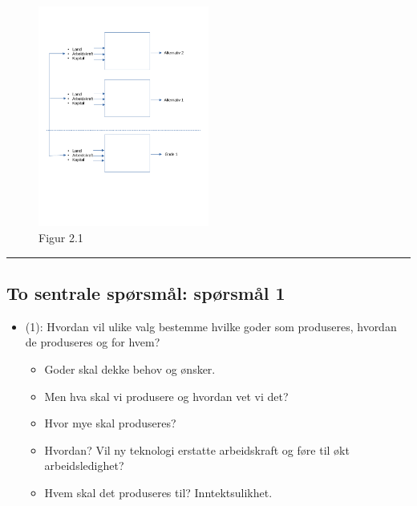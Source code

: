 \documentclass[
  letterpaper,
  DIV=11,
  numbers=noendperiod]{scrartcl}
\providecommand{\tightlist}{%
  \setlength{\itemsep}{0pt}\setlength{\parskip}{0pt}}\usepackage{longtable,booktabs,array}
\begin{document}
\begin{figure}[H]

{\centering \includegraphics[width=0.5\textwidth,height=\textheight]{allenotater_files/mediabag/drawio/alternativ.pdf}

}

\caption{Figur 2.1}

\end{figure}%

\begin{center}\rule{0.5\linewidth}{0.5pt}\end{center}

\subsection{To sentrale spørsmål: spørsmål
1}\label{to-sentrale-spuxf8rsmuxe5l-spuxf8rsmuxe5l-1}

\begin{itemize}
\tightlist
\item
  (1): Hvordan vil ulike valg bestemme hvilke goder som produseres,
  hvordan de produseres og for hvem?

  \begin{itemize}
  \tightlist
  \item
    Goder skal dekke behov og ønsker.
  \item
    Men hva skal vi produsere og hvordan vet vi det?
  \item
    Hvor mye skal produseres?
  \item
    Hvordan? Vil ny teknologi erstatte arbeidskraft og føre til økt
    arbeidsledighet?
  \item
    Hvem skal det produseres til? Inntektsulikhet.
  \end{itemize}
\end{itemize}
\end{document}
